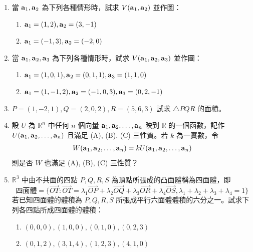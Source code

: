 \begin{enumerate}[label=\arabic*., leftmargin=2em]
  \item 當 $\boldsymbol{\mathbf{a}}_1, \boldsymbol{\mathbf{a}}_2$ 為下列各種情形時，試求 $V(\boldsymbol{\mathbf{a}}_1, \boldsymbol{\mathbf{a}}_2)$ 並作圖：
  \begin{enumerate}[label=(\roman*)]
    \item $\boldsymbol{\mathbf{a}}_1=(1, 2), \boldsymbol{\mathbf{a}}_2=(3, -1)$
    \item $\boldsymbol{\mathbf{a}}_1=(-1, 3), \boldsymbol{\mathbf{a}}_2=(-2, 0)$
  \end{enumerate}

  \item 當 $\boldsymbol{\mathbf{a}}_1, \boldsymbol{\mathbf{a}}_2, \boldsymbol{\mathbf{a}}_3$ 為下列各種情形時，試求 $V(\boldsymbol{\mathbf{a}}_1, \boldsymbol{\mathbf{a}}_2, \boldsymbol{\mathbf{a}}_3)$ 並作圖：
  \begin{enumerate}[label=(\roman*)]
    \item $\boldsymbol{\mathbf{a}}_1=(1, 0, 1), \boldsymbol{\mathbf{a}}_2=(0, 1, 1), \boldsymbol{\mathbf{a}}_3=(1, 1, 0)$
    \item $\boldsymbol{\mathbf{a}}_1=(1, -1, 2), \boldsymbol{\mathbf{a}}_2=(-1, 0, 3), \boldsymbol{\mathbf{a}}_3=(0, 2, -1)$
  \end{enumerate}

  \item $P=(1, -2, 1), Q=(2, 0, 2), R=(5, 6, 3)$ 試求 $\triangle PQR$ 的面積。

  \item[\textbf{*4.}] 設 $U$ 為 $\mathbb{R}^n$ 中任何 $n$ 個向量 $\boldsymbol{\mathbf{a}}_1, \boldsymbol{\mathbf{a}}_2, \dots, \boldsymbol{\mathbf{a}}_n$ 映到 $\mathbb{R}$ 的一個函數，記作 $U(\boldsymbol{\mathbf{a}}_1, \boldsymbol{\mathbf{a}}_2, \dots, \boldsymbol{\mathbf{a}}_n)$ 且滿足 (A), (B), (C) 三性質。若 $k$ 為一實數，令
  \[ W(\boldsymbol{\mathbf{a}}_1, \boldsymbol{\mathbf{a}}_2, \dots, \boldsymbol{\mathbf{a}}_n) = k U(\boldsymbol{\mathbf{a}}_1, \boldsymbol{\mathbf{a}}_2, \dots, \boldsymbol{\mathbf{a}}_n) \]
  則是否 $W$ 也滿足 (A), (B), (C) 三性質？

  \item[\textbf{*5.}] $\mathbb{R}^3$ 中由不共面的四點 $P, Q, R, S$ 為頂點所張成的凸面體稱為四面體，即
  \[ \text{四面體} = \{ \vec{OT} : \vec{OT} = \lambda_1\vec{OP} + \lambda_2\vec{OQ} + \lambda_3\vec{OR} + \lambda_4\vec{OS}, \lambda_1+\lambda_2+\lambda_3+\lambda_4 = 1 \} \]
  若已知四面體的體積為 $P, Q, R, S$ 所張成平行六面體體積的六分之一。試求下列各四點所成四面體的體積：
  \begin{enumerate}[label=(\roman*)]
    \item $(0, 0, 0), (1, 0, 0), (0, 1, 0), (0, 2, 3)$
    \item $(0, 1, 2), (3, 1, 4), (1, 2, 3), (4, 1, 0)$
  \end{enumerate}


\end{enumerate}
